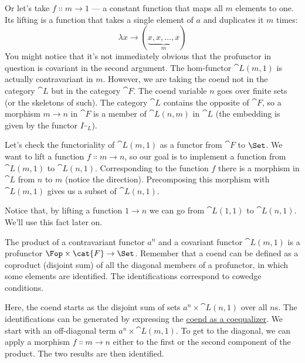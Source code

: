 Or let's take $f \Colon m \to 1$ --- a constant
function that maps all $m$ elements to one. Its lifting is a function that
takes a single element of $a$ and duplicates it $m$ times:
\[\lambda{}x \to (\underbrace{x, x, \ldots{}, x}_{m})\]
You might notice that it's not immediately obvious that the profunctor
in question is covariant in the second argument. The hom-functor
$\cat{L}(m, 1)$ is actually contravariant in $m$. However, we
are taking the coend not in the category $\cat{L}$ but in the category
$\cat{F}$. The coend variable $n$ goes over finite sets (or the
skeletons of such). The category $\cat{L}$ contains the opposite of
$\cat{F}$, so a morphism $m \to n$ in $\cat{F}$
is a member of $\cat{L}(n, m)$ in $\cat{L}$ (the embedding is given
by the functor $I_{\cat{L}}$).

Let's check the functoriality of $\cat{L}(m, 1)$ as a functor from
$\cat{F}$ to $\Set$. We want to lift a function
$f \Colon m \to n$, so our goal is to implement a
function from $\cat{L}(m, 1)$ to $\cat{L}(n, 1)$. Corresponding to
the function $f$ there is a morphism in $\cat{L}$ from
$n$ to $m$ (notice the direction). Precomposing this
morphism with $\cat{L}(m, 1)$ gives us a subset of
$\cat{L}(n, 1)$.

\begin{figure}[H]
  \centering
\end{figure}

\noindent
Notice that, by lifting a function $1 \to n$ we can go
from $\cat{L}(1, 1)$ to $\cat{L}(n, 1)$. We'll use this fact later
on.

The product of a contravariant functor $a^n$ and a covariant
functor $\cat{L}(m, 1)$ is a profunctor
$\Fop \times \cat{F} \to \Set$. Remember that a coend can be defined
as a coproduct (disjoint sum) of all the diagonal members of a
profunctor, in which some elements are identified. The identifications
correspond to cowedge conditions.

Here, the coend starts as the disjoint sum of sets
$a^n \times \cat{L}(n, 1)$ over all $n$s. The identifications can
be generated by expressing the
\hyperref[ends-and-coends]{coend as
  a coequalizer}. We start with an off-diagonal term
$a^n \times \cat{L}(m, 1)$. To get to the diagonal, we can apply a
morphism $f \Colon m \to n$ either to the first or
the second component of the product. The two results are then
identified.

